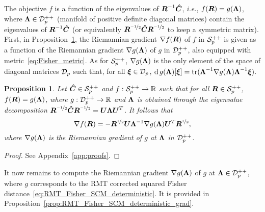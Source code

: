 \documentclass{article}
\theoremstyle{plain}
\newtheorem{proposition}[theorem]{Proposition}
\theoremstyle{definition}
\theoremstyle{remark}
\begin{document}
The objective $f$ is a function of the eigenvalues of $\boldsymbol{R}^{-1}\boldsymbol{\hat{C}}$, \emph{i.e.}, $f(\boldsymbol{R})=g(\boldsymbol{\Lambda})$, where $\boldsymbol{\Lambda}\in\mathcal{D}^{++}_{p}$  (manifold of positive definite diagonal matrices) contain the eigenvalues of $\boldsymbol{R}^{-1}\boldsymbol{\hat{C}}$ (or equivalently $\boldsymbol{R}^{\nicefrac{-1}{2}}\boldsymbol{\hat{C}}\boldsymbol{R}^{\nicefrac{-1}{2}}$ to keep a symmetric matrix).
First, in Proposition~\ref{prop:Rgrad_eigsfun}, the Riemannian gradient $\nabla f(\boldsymbol{R})$ of $f$ in $\mathcal{S}^{++}_{p}$ is given as a function of the Riemannian gradient $\nabla g(\boldsymbol{\Lambda})$ of $g$ in $\mathcal{D}^{++}_{p}$, also equipped with metric~\eqref{eq:Fisher_metric}.
As for $\mathcal{S}^{++}_{p}$, $\nabla g(\boldsymbol{\Lambda})$ is the only element of the space of diagonal matrices $\mathcal{D}_{p}$ such that, for all $\boldsymbol{\xi}\in\mathcal{D}_{p}$,
    $\operatorname{d} g(\boldsymbol{\Lambda})[\boldsymbol{\xi}] = \operatorname{tr}(\boldsymbol{\Lambda}^{-1}\nabla g(\boldsymbol{\Lambda})\boldsymbol{\Lambda}^{-1}\boldsymbol{\xi}).$
%
\begin{proposition}
\label{prop:Rgrad_eigsfun}
    Let $\boldsymbol{\hat{C}}\in\mathcal{S}^{++}_{p}$ and $f:\mathcal{S}^{++}_{p}\to\mathbb{R}$ such that for all $\boldsymbol{R}\in\mathcal{S}^{++}_{p}$, $f(\boldsymbol{R})=g(\boldsymbol{\Lambda})$, where $g:\mathcal{D}^{++}_{p}\to\mathbb{R}$ and $\boldsymbol{\Lambda}$ is obtained through the eigenvalue decomposition $\boldsymbol{R}^{\nicefrac{-1}{2}}\boldsymbol{\hat{C}}\boldsymbol{R}^{\nicefrac{-1}{2}}=\boldsymbol{U}\boldsymbol{\Lambda}\boldsymbol{U}^T$.
    It follows that
    \begin{equation*}
        \nabla f(\boldsymbol{R}) = -\boldsymbol{R}^{\nicefrac12}\boldsymbol{U}\boldsymbol{\Lambda}^{-1}\nabla g(\boldsymbol{\Lambda})\boldsymbol{U}^T\boldsymbol{R}^{\nicefrac12},
    \end{equation*}
    where $\nabla g(\boldsymbol{\Lambda})$ is the Riemannian gradient of $g$ at $\boldsymbol{\Lambda}$ in $\mathcal{D}^{++}_{p}$.
\end{proposition}
\begin{proof}
    See Appendix~\ref{app:proofs}.
\end{proof}
%
It now remains to compute the Riemannian gradient $\nabla g(\boldsymbol{\Lambda})$ of $g$ at $\boldsymbol{\Lambda}\in\mathcal{D}^{++}_{p}$, where $g$ corresponds to the RMT corrected squared Fisher distance~\eqref{eq:RMT_Fisher_SCM_deterministic}.
It is provided in Proposition~\ref{prop:RMT_Fisher_SCM_deterministic_grad}.
%
\end{document}
